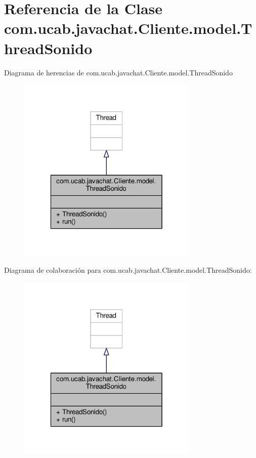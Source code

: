\hypertarget{classcom_1_1ucab_1_1javachat_1_1_cliente_1_1model_1_1_thread_sonido}{\section{Referencia de la Clase com.\-ucab.\-javachat.\-Cliente.\-model.\-Thread\-Sonido}
\label{classcom_1_1ucab_1_1javachat_1_1_cliente_1_1model_1_1_thread_sonido}
}


Diagrama de herencias de com.\-ucab.\-javachat.\-Cliente.\-model.\-Thread\-Sonido
\nopagebreak
\begin{figure}[H]
\begin{center}
\leavevmode
\includegraphics[width=244pt]{d4/d89/classcom_1_1ucab_1_1javachat_1_1_cliente_1_1model_1_1_thread_sonido__inherit__graph}
\end{center}
\end{figure}


Diagrama de colaboración para com.\-ucab.\-javachat.\-Cliente.\-model.\-Thread\-Sonido\-:
\nopagebreak
\begin{figure}[H]
\begin{center}
\leavevmode
\includegraphics[width=244pt]{dc/d36/classcom_1_1ucab_1_1javachat_1_1_cliente_1_1model_1_1_thread_sonido__coll__graph}
\end{center}
\end{figure}

